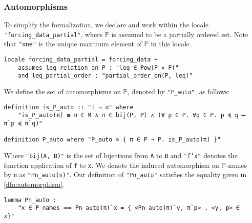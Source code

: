 \documentclass{report}
\newenvironment{isaframe}{\begin{mdframed}[topline=false, rightline=false, bottomline=false]}{\end{mdframed}}
\begin{document}
\subsubsection{Automorphisms}
To simplify the formalization, we declare and work within the locale \texttt{"forcing\_data\_partial"}, 
where $\mathbb{P}$ is assumed to be a partially ordered set. 
Note that \texttt{"one"} is the unique maximum element of $\mathbb{P}$ in this locale.

\begin{isaframe}
\begin{verbatim}
locale forcing_data_partial = forcing_data + 
    assumes leq_relation_on_P : "leq ∈ Pow(P × P)" 
    and leq_partial_order : "partial_order_on(P, leq)" 
\end{verbatim}
\end{isaframe}

We define the set of automorphisms on $\mathbb{P}$, denoted by \texttt{"P\_auto"}, as follows:
\begin{isaframe}
\begin{verbatim}
definition is_P_auto :: "i ⇒ o" where
    "is_P_auto(π) ≡ π ∈ M ∧ π ∈ bij(P, P) ∧ (∀ p ∈ P. ∀q ∈ P. p ≼ q ⟷ π`p ≼ π`q)"  

definition P_auto where "P_auto ≡ { π ∈ P → P. is_P_auto(π) }" 
\end{verbatim}
\end{isaframe}

Where \texttt{"bij(A, B)"} is the set of bijections from \texttt{A} to \texttt{B}
and \texttt{"f`x"} denotes the function application of \texttt{f} to \texttt{x}.
We denote the induced automorphism on $\mathbb{P}$-names by \texttt{π} as \texttt{"Pn\_auto(π)"}.
Our definition of \texttt{"Pn\_auto"} satisfies the equality given in \cref{dfn:automorphism}.

\begin{isaframe}
\begin{verbatim}
lemma Pn_auto : 
    "x ∈ P_names ⟹ Pn_auto(π)`x = { <Pn_auto(π)`y, π`p> . <y, p> ∈ x}"  
\end{verbatim}
\end{isaframe}
\end{document}

